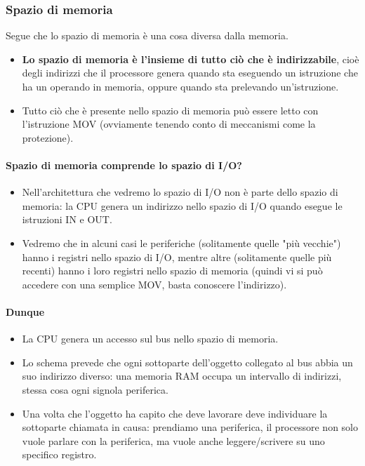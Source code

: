 \subsubsection{Spazio di memoria} Segue che lo spazio di memoria è una cosa diversa dalla memoria.
\begin{itemize}
	\item \textbf{Lo spazio di memoria è l'insieme di tutto ciò che è indirizzabile}, cioè degli indirizzi che il processore genera quando sta eseguendo un istruzione che ha un operando in memoria, oppure quando sta prelevando un'istruzione.
	\item Tutto ciò che è presente nello spazio di memoria può essere letto con l'istruzione MOV (ovviamente tenendo conto di meccanismi come la protezione).
\end{itemize}
\paragraph{Spazio di memoria comprende lo spazio di I/O?} 
\begin{itemize}
	\item Nell'architettura che vedremo lo spazio di I/O non è parte dello spazio di memoria: la CPU genera un indirizzo nello spazio di I/O quando esegue le istruzioni IN e OUT.
	\item Vedremo che in alcuni casi le periferiche (solitamente quelle "più vecchie") hanno i registri nello spazio di I/O, mentre altre (solitamente quelle più recenti) hanno i loro registri nello spazio di memoria (quindi vi si può accedere con una semplice MOV, basta conoscere l'indirizzo).
\end{itemize} 
\paragraph{Dunque}
\begin{itemize}
	\item La CPU genera un accesso sul bus nello spazio di memoria.
	\item Lo schema prevede che ogni sottoparte dell'oggetto collegato al bus abbia un suo indirizzo diverso: una memoria RAM occupa un intervallo di indirizzi, stessa cosa ogni signola periferica. 
	\item Una volta che l'oggetto ha capito che deve lavorare deve individuare la sottoparte chiamata in causa: prendiamo una periferica, il processore non solo vuole parlare con la periferica, ma vuole anche leggere/scrivere su uno specifico registro.
\end{itemize}

